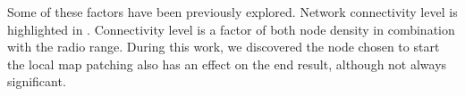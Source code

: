 Some of these factors have been previously explored.  Network connectivity level is highlighted in \cite{CCA-MAP09}.  Connectivity level is a factor of both node density in combination with the radio range.  During this work, we discovered the node chosen to start the local map patching also has an effect on the end result, although not always significant.  
